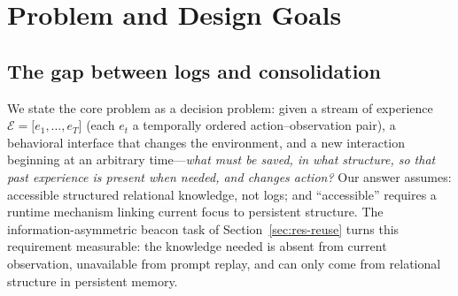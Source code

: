 \documentclass[10pt,a4paper]{article}
\begin{document}
\section{Problem and Design Goals}
\label{sec:problem}

\subsection{The gap between logs and consolidation}
We state the core problem as a decision problem: given a stream of experience $\mathcal{E}={[}e_1,\ldots,e_T{]} $ (each $e_t$ a temporally ordered action--observation pair), a behavioral interface that changes the environment, and a new interaction beginning at an arbitrary time---\emph{what must be saved, in what structure, so that past experience is present when needed, and changes action?} Our answer assumes: accessible structured relational knowledge, not logs; and ``accessible'' requires a runtime mechanism linking current focus to persistent structure. The information-asymmetric beacon task of Section~\ref{sec:res-reuse} turns this requirement measurable: the knowledge needed is absent from current observation, unavailable from prompt replay, and can only come from relational structure in persistent memory.
\end{document}
